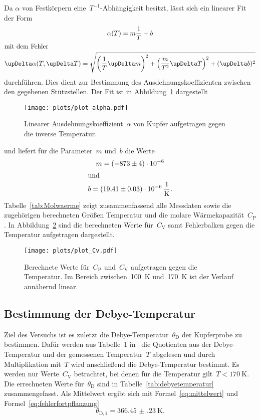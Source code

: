 Da $\alpha$ von Festkörpern eine~$T^{-1}$-Abhängigkeit besitzt, lässt sich ein linearer Fit der Form
\begin{gather}
  \alpha(T)=m\frac{1}{T}+b \\
  \shortintertext{mit dem Fehler}
  \upDelta\alpha(T,\upDelta T)=\sqrt{\left(\frac{1}{T}\upDelta m\right)^2+\left(\frac{m}{T^2}\upDelta T\right)^2+(\upDelta b)^2}
\end{gather}
durchführen. Dies dient zur Bestimmung des Ausdehnungskoeffizienten zwischen den gegebenen Stützstellen.
Der Fit ist in Abbildung~\ref{fig:plot_alpha} dargestellt\\
\newline
\begin{figure}[htb]
    \centering
    \texttt{[image: plots/plot\_alpha.pdf]}
    \caption{Linearer Ausdehnungskoeffizient~$\alpha$ von Kupfer aufgetragen
    gegen die inverse Temperatur.}
    \label{fig:plot_alpha}
\end{figure}
und liefert für die Parameter~$m$ und~$b$ die Werte
\begin{gather}
  m = \SI{-873(4)e-6}{} \\
  \shortintertext{und}
  b = \SI{19.41(3)e-6}{\per\kelvin}.
\end{gather}
Tabelle~\ref{tab:Molwaerme} zeigt zusammenfassend alle Messdaten
sowie die zugehörigen berechneten Größen Temperatur und die molare Wärmekapazität~$C_{\mathrm{P}}$.
In Abbildung~\ref{fig:plot_Cv} sind
die berechneten Werte für~$C_{\mathrm{V}}$ samt Fehlerbalken gegen die Temperatur aufgetragen dargestellt.\\

\begin{figure}[htb]
    \centering
    \texttt{[image: plots/plot\_Cv.pdf]}
    \caption{Berechnete Werte für~$C_{\mathrm{P}}$ und~$C_{\mathrm{V}}$
    aufgetragen gegen die Temperatur. Im Bereich zwischen~\SI{100}{\kelvin}
    und~\SI{170}{\kelvin} ist der Verlauf annähernd linear.}
    \label{fig:plot_Cv}
\end{figure}

\subsection{Bestimmung der Debye-Temperatur}
Ziel des Versuchs ist es zuletzt die Debye-Temperatur~$\theta_{\mathrm{D}}$ der Kupferprobe zu
bestimmen. Dafür werden aus Tabelle~1 in~\cite{anleitung} die Quotienten aus der
Debye-Temperatur und der gemessenen Temperatur~$T$ abgelesen und durch
Multiplikation mit~$T$ wird anschließend die Debye-Temperatur bestimmt. Es werden nur
Werte~$C_{\mathrm{V}}$ betrachtet, bei denen für die Temperatur gilt~$T<\SI{170}{\kelvin}$.
Die errechneten Werte für~$\theta_{\mathrm{D}}$ sind in
Tabelle~\ref{tab:debyetemperatur} zusammengefasst. Als Mittelwert ergibt sich
mit Formel~\eqref{eq:mittelwert} und Formel~\eqref{eq:fehlerfortpflanzung}
\begin{equation}
  \theta_{\mathrm{D},1}=\SI{366.45(23)}{\kelvin}.
\end{equation}

